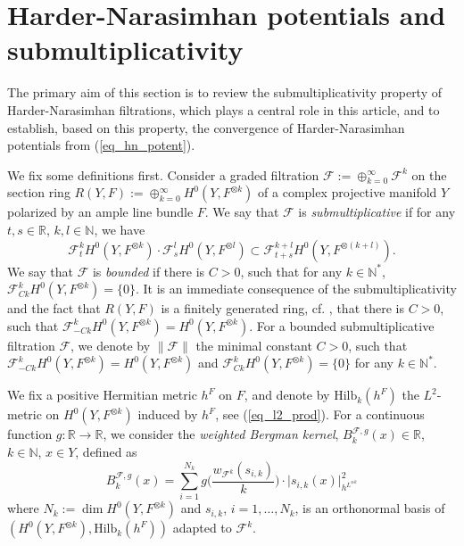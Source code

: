 \documentclass[12pt]{article}
\numberwithin{equation}{section}
\theoremstyle{theorem}
\theoremstyle{definition}
\theoremstyle{remark}
\newcommand{\real}{\mathbb{R}}
\newcommand{\nat}{\mathbb{N}}
\begin{document}
	\section{Harder-Narasimhan potentials and submultiplicativity}\label{sect_subm_hn_filt}
	The primary aim of this section is to review the submultiplicativity property of Harder-Narasimhan filtrations, which plays a central role in this article, and to establish, based on this property, the convergence of Harder-Narasimhan potentials from (\ref{eq_hn_potent}).
	\par 
	We fix some definitions first.	
	Consider a graded filtration $\mathcal{F} := \oplus_{k = 0}^{\infty} \mathcal{F}^k$ on the section ring $R(Y, F) := \oplus_{k = 0}^{\infty} H^0(Y, F^{\otimes k})$ of a complex projective manifold $Y$ polarized by an ample line bundle $F$.
	We say that $\mathcal{F}$ is \textit{submultiplicative} if for any $t, s \in \real$, $k, l \in \nat$, we have 
	\begin{equation}\label{eq_sm_cond}
		\mathcal{F}^k_t H^0(Y, F^{\otimes k}) \cdot \mathcal{F}^l_s H^0(Y, F^{\otimes l}) \subset \mathcal{F}^{k + l}_{t + s} H^0(Y, F^{\otimes (k + l)}).
	\end{equation}
	We say that $\mathcal{F}$ is \textit{bounded} if there is $C > 0$, such that for any $k \in \nat^*$, $\mathcal{F}^k_{C k} H^0(Y, F^{\otimes k}) = \{0\}$.
	It is an immediate consequence of the submultiplicativity and the fact that $R(Y, F)$ is a finitely generated ring, cf. \cite[Example 2.1.30]{LazarBookI}, that there is $C > 0$, such that $\mathcal{F}^k_{ - C k} H^0(Y, F^{\otimes k}) = H^0(Y, F^{\otimes k})$.
	For a bounded submultiplicative filtration $\mathcal{F}$, we denote by $\| \mathcal{F} \|$ the minimal constant $C > 0$, such that $\mathcal{F}^k_{ - C k} H^0(Y, F^{\otimes k}) = H^0(Y, F^{\otimes k})$ and $\mathcal{F}^k_{ C k} H^0(Y, F^{\otimes k}) = \{0\}$ for any $k \in \nat^*$.
	\par 
	\begin{sloppypar}
	We fix a positive Hermitian metric $h^F$ on $F$, and denote by ${\textrm{Hilb}}_k(h^F)$ the $L^2$-metric on $H^0(Y, F^{\otimes k})$ induced by $h^F$, see (\ref{eq_l2_prod}).
	For a continuous function $g : \real \to \real$, we consider the \textit{weighted Bergman kernel}, $B_k^{\mathcal{F}, g}(x) \in \real$, $k \in \mathbb{N}$, $x \in Y$, defined as 
	\begin{equation}\label{eq_weight_berg}
		B_k^{\mathcal{F}, g}(x) 
		= 
		\sum_{i = 1}^{N_k} g \Big( \frac{w_{\mathcal{F}^k}(s_{i, k})}{k} \Big) \cdot \big| s_{i, k}(x) \big|_{h^{L^{\otimes k}}}^2
	\end{equation}
	where $N_k := \dim H^0(Y, F^{\otimes k})$ and $s_{i, k}$, $i = 1, \ldots, N_k$, is an orthonormal basis of $(H^0(Y, F^{\otimes k}), {\textrm{Hilb}}_k(h^F))$ adapted to $\mathcal{F}^k$.
	\end{sloppypar}
\end{document}
